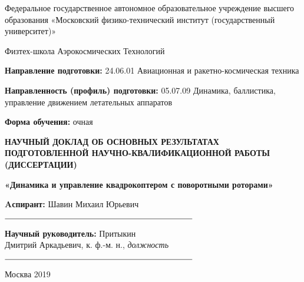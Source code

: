 \thispagestyle{empty}
\begin{center} 
Федеральное государственное автономное образовательное учреждение  высшего образования «Московский физико-технический институт (государственный университет)»
\end{center}
\begin{center} 
Физтех-школа Аэрокосмических Технологий
\end{center}

{
   	\vskip 1cm
}

\begin{flushleft}
\textbf{Направление подготовки:} 24.06.01 Авиационная и ракетно-космическая техника

\textbf{Направленность (профиль) подготовки:} 05.07.09 Динамика, баллистика, управление движением летательных аппаратов

\textbf{Форма обучения:} очная
\end{flushleft}

{
	\vskip 1cm
}

\begin{center} 
\textbf{НАУЧНЫЙ ДОКЛАД ОБ ОСНОВНЫХ РЕЗУЛЬТАТАХ ПОДГОТОВЛЕННОЙ НАУЧНО-КВАЛИФИКАЦИОННОЙ РАБОТЫ (ДИССЕРТАЦИИ)}
\end{center}

\begin{center} 
\textbf{«Динамика и управление квадрокоптером с поворотными роторами»}
\end{center}

{
	\vskip 1cm
}


\begin{flushright}
\textbf{Aспирант:} Шавин Михаил Юрьевич

$\rule{8cm}{0.15mm}$

\textbf{Научный руководитель:} Притыкин \\ Дмитрий Аркадьевич, к. ф.-м. н., \textit{должность}

$\rule{8cm}{0.15mm}$

\end{flushright}

{
	\vskip 1cm
}

\begin{center} 
Москва 2019
\end{center}
